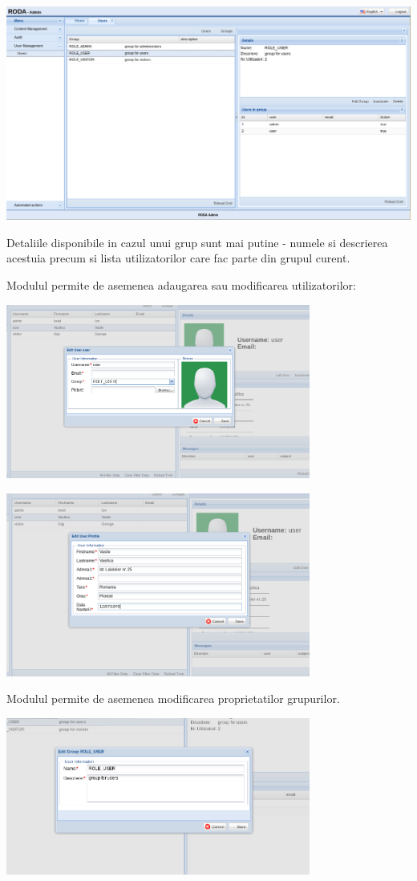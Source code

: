 \includegraphics[width=15cm]{user/user4}

Detaliile disponibile in cazul unui grup sunt mai putine - numele
si descrierea acestuia precum si lista utilizatorilor care fac parte
din grupul curent. 

Modulul permite de asemenea adaugarea sau modificarea utilizatorilor:

\includegraphics[width=10cm]{user/user2}

\includegraphics[width=10cm]{user/user3}

Modulul permite de asemenea modificarea proprietatilor grupurilor.

\includegraphics[width=10cm]{user/user5}
